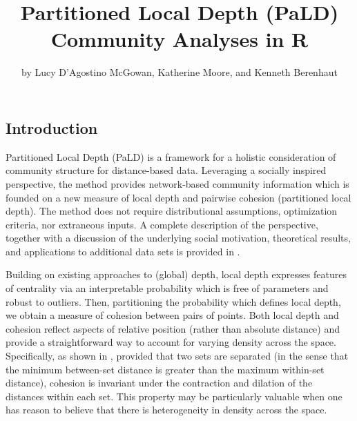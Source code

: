\title{Partitioned Local Depth (PaLD) Community Analyses in R}
\author{by Lucy D'Agostino McGowan, Katherine Moore, and Kenneth Berenhaut}

\maketitle


\hypertarget{introduction}{%
\subsection{Introduction}\label{introduction}}

Partitioned Local Depth (PaLD) is a framework for a holistic
consideration of community structure for distance-based data. Leveraging
a socially inspired perspective, the method provides network-based
community information which is founded on a new measure of local depth
and pairwise cohesion (partitioned local depth). The method does not
require distributional assumptions, optimization criteria, nor
extraneous inputs. A complete description of the perspective, together
with a discussion of the underlying social motivation, theoretical
results, and applications to additional data sets is provided in
\citet{berenhaut2022social}.

Building on existing approaches to (global) depth, local depth expresses
features of centrality via an interpretable probability which is free of
parameters and robust to outliers. Then, partitioning the probability
which defines local depth, we obtain a measure of cohesion between pairs
of points. Both local depth and cohesion reflect aspects of relative
position (rather than absolute distance) and provide a straightforward
way to account for varying density across the space. Specifically, as
shown in \citet{berenhaut2022social}, provided that two sets are
separated (in the sense that the minimum between-set distance is greater
than the maximum within-set distance), cohesion is invariant under the
contraction and dilation of the distances within each set. This property
may be particularly valuable when one has reason to believe that there
is heterogeneity in density across the space.

